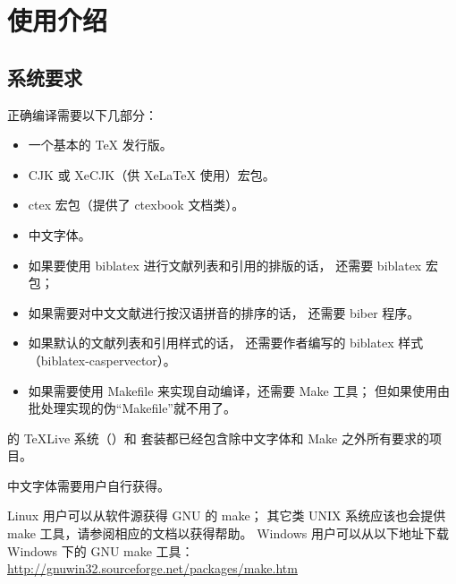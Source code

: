 %

\chapter{使用介绍}
	\section{系统要求}\label{sec:req}

	正确编译需要以下几部分：
	\begin{itemize}
		\item 一个基本的 \TeX{} 发行版。
		\item CJK 或 XeCJK（供 Xe\LaTeX{} 使用）宏包。
		\item ctex 宏包\supercite{ctex,ctex-faq}（提供了 ctexbook 文档类）。
		\item 中文字体。
		\item 如果要使用 biblatex 进行文献列表和引用的排版的话，
			还需要 biblatex 宏包\supercite{biblatex}；
		\item 如果需要对中文文献进行按汉语拼音的排序的话，
			还需要 biber 程序\supercite{biber}。
		\item 如果默认的文献列表和引用样式的话，
			还需要作者编写的 biblatex 样式
			（biblatex-caspervector）\supercite{biblatex-caspervector}。
		\item 如果需要使用 Makefile 来实现自动编译，还需要 Make 工具；
			但如果使用由批处理实现的伪“Makefile”就不用了。
	\end{itemize}

	的 \TeX{}Live 系统（）和 \CTeX{} 套装都已经包含除中文字体和 Make 之外所有要求的项目。%

	中文字体需要用户自行获得。

	Linux 用户可以从软件源获得 GNU 的 make；
	其它类 UNIX 系统应该也会提供 make 工具，请参阅相应的文档以获得帮助。%
	Windows 用户可以从以下地址下载 Windows 下的 GNU make 工具：\\
	\hspace*{\parindent}%
	\url{http://gnuwin32.sourceforge.net/packages/make.htm}

